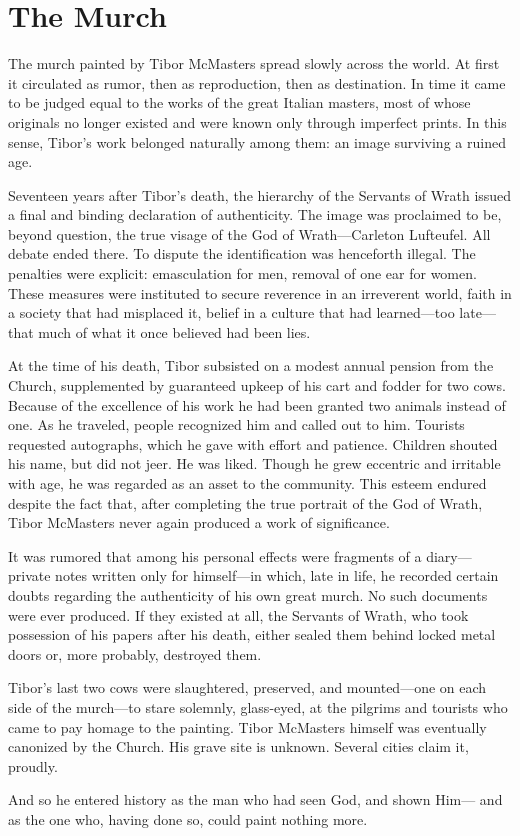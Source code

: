 \chapter{The Murch}

The murch painted by Tibor McMasters spread slowly across the world. At first it circulated as rumor, then as reproduction, then as destination. In time it came to be judged equal to the works of the great Italian masters, most of whose originals no longer existed and were known only through imperfect prints. In this sense, Tibor’s work belonged naturally among them: an image surviving a ruined age.

Seventeen years after Tibor’s death, the hierarchy of the Servants of Wrath issued a final and binding declaration of authenticity. The image was proclaimed to be, beyond question, the true visage of the God of Wrath—Carleton Lufteufel. All debate ended there. To dispute the identification was henceforth illegal. The penalties were explicit: emasculation for men, removal of one ear for women. These measures were instituted to secure reverence in an irreverent world, faith in a society that had misplaced it, belief in a culture that had learned—too late—that much of what it once believed had been lies.

At the time of his death, Tibor subsisted on a modest annual pension from the Church, supplemented by guaranteed upkeep of his cart and fodder for two cows. Because of the excellence of his work he had been granted two animals instead of one. As he traveled, people recognized him and called out to him. Tourists requested autographs, which he gave with effort and patience. Children shouted his name, but did not jeer. He was liked. Though he grew eccentric and irritable with age, he was regarded as an asset to the community. This esteem endured despite the fact that, after completing the true portrait of the God of Wrath, Tibor McMasters never again produced a work of significance.

It was rumored that among his personal effects were fragments of a diary—private notes written only for himself—in which, late in life, he recorded certain doubts regarding the authenticity of his own great murch. No such documents were ever produced. If they existed at all, the Servants of Wrath, who took possession of his papers after his death, either sealed them behind locked metal doors or, more probably, destroyed them.

Tibor’s last two cows were slaughtered, preserved, and mounted—one on each side of the murch—to stare solemnly, glass-eyed, at the pilgrims and tourists who came to pay homage to the painting. Tibor McMasters himself was eventually canonized by the Church. His grave site is unknown. Several cities claim it, proudly.

And so he entered history as the man who had seen God, and shown Him—
and as the one who, having done so, could paint nothing more.

